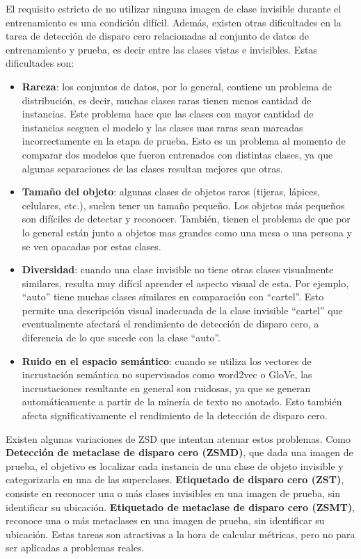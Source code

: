 El requisito estricto de no utilizar ninguna imagen de clase invisible durante el entrenamiento es una condición difícil. Además, existen otras dificultades en la tarea de detección de disparo cero relacionadas al conjunto de datos de entrenamiento y prueba, es decir entre las clases vistas e invisibles. Estas dificultades son:

\begin{itemize}
	\item \textbf{Rareza}: los conjuntos de datos, por lo general, contiene un problema de distribución, es decir, muchas clases raras tienen menos cantidad de instancias. Este problema hace que las clases con mayor cantidad de instancias sesguen el modelo y las clases mas raras sean marcadas incorrectamente en la etapa de prueba. Esto es un problema al momento de comparar dos modelos que fueron entrenados con distintas clases, ya que algunas separaciones  de las clases resultan mejores que otras.

	\item \textbf{Tamaño del objeto}: algunas clases de objetos raros (tijeras, lápices, celulares, etc.), suelen tener un tamaño pequeño. Los objetos más pequeños son difíciles de detectar y reconocer. También, tienen el problema de que por lo general están junto a objetos mas grandes como una mesa o una persona y se ven opacadas por estas clases.

	\item \textbf{Diversidad}: cuando una clase invisible no tiene otras clases visualmente similares, resulta muy difícil aprender el aspecto visual de esta. Por ejemplo, ``auto'' tiene muchas clases similares en comparación con ``cartel''. Esto permite una descripción visual inadecuada de la clase invisible ``cartel'' que eventualmente afectará el rendimiento de detección de disparo cero, a diferencia de lo que sucede con la clase ``auto''.

	\item \textbf{Ruido en el espacio semántico}: cuando se utiliza los vectores de incrustación semántica no supervisados como word2vec o GloVe, las incrustaciones resultante en general son ruidosas, ya que se generan automáticamente a partir de la minería de texto no anotado. Esto también afecta significativamente el rendimiento de la detección de disparo cero.
\end{itemize}

Existen algunas variaciones de ZSD que intentan atenuar estos problemas. Como \textbf{Detección de metaclase de disparo cero (ZSMD)}, que dada una imagen de prueba, el objetivo es localizar cada instancia de una clase de objeto invisible y categorizarla en una de las superclases. \textbf{Etiquetado de disparo cero (ZST)}, consiste en reconocer una o más clases invisibles en una imagen de prueba, sin identificar su ubicación. \textbf{Etiquetado de metaclase de disparo cero (ZSMT)}, reconoce una o más metaclases en una imagen de prueba, sin identificar su ubicación. Estas tareas son atractivas a 
la hora de calcular métricas, pero no para ser aplicadas a problemas reales.
